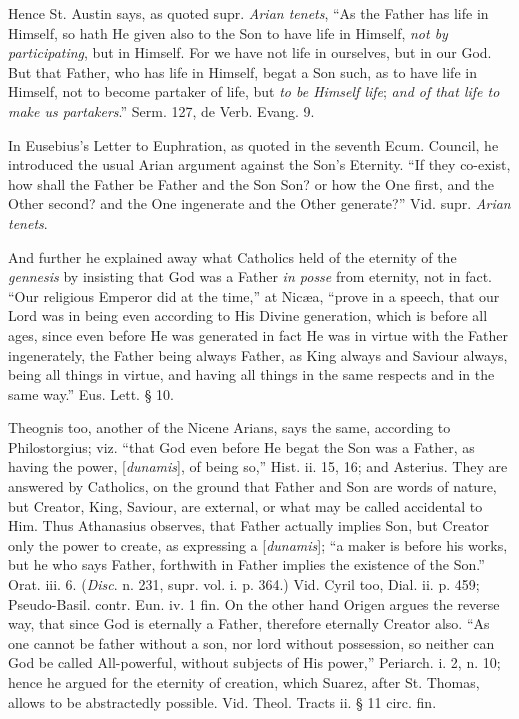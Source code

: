 Hence St. Austin says, as quoted supr. \emph{Arian
tenets}, ``As the
Father has life in Himself, so hath He given also to the Son to have
life in Himself, \emph{not by participating},
but in Himself. For we have not life in ourselves, but in our God. But
that Father, who has life in Himself, begat a Son such, as to have
life in Himself, not to become partaker of life, but \emph{to be Himself
life}; \emph{and of that life to make us partakers}.'' Serm. 127, de
Verb. Evang. 9.

In Eusebius's Letter to Euphration, as quoted in
the seventh Ecum. Council, he introduced the usual Arian argument
against the Son's Eternity. ``If they co-exist, how shall the Father be
Father and the Son Son? or how the One first, and the Other second?
and the One ingenerate and the Other generate?'' Vid. supr. \emph{Arian
tenets}.

And further he explained away what Catholics held
of the eternity of the \emph{gennesis}
by insisting that God was a Father \emph{in posse} from eternity, not in fact. ``Our
religious Emperor did at the time,'' at Nicæa, ``prove
in a speech, that our Lord was in being even according to His Divine
generation, which is before all ages, since even before He was
generated in fact He was in virtue with the Father ingenerately, the
Father being always Father, as King always and Saviour always, being
all things in virtue, and having all things in the same respects and
in the same way.'' Eus. Lett. § 10.

Theognis too, another of the Nicene Arians, says
the same, according to Philostorgius; viz. ``that
God even before He begat the Son was a Father, as having the power, [\emph{dunamis}],
of being so,'' Hist. ii. 15, 16; and Asterius. They are answered by
Catholics, on the ground that Father and Son are words of nature, but
Creator, King, Saviour, are external, or what may be called accidental
to Him. Thus Athanasius observes, that Father actually implies Son,
but Creator only the power to create, as expressing a [\emph{dunamis}];
``a maker is before his works, but he who says Father, forthwith in
Father implies the existence of the Son.'' Orat. iii. 6. (\emph{Disc}.
n. 231, supr. vol. i. p. 364.) Vid. Cyril too, Dial. ii. p.
459; Pseudo-Basil. contr. Eun. iv. 1 fin. On the other hand Origen
argues the reverse way, that since God is eternally a Father,
therefore eternally Creator also. ``As one cannot be father without a
son, nor lord without possession, so neither can God be called
All-powerful, without subjects of His power,'' Periarch. i. 2, n. 10;
hence he argued for the eternity of creation, which Suarez, after St.
Thomas, allows to be abstractedly possible. Vid. Theol. Tracts ii. §
11 circ. fin.

